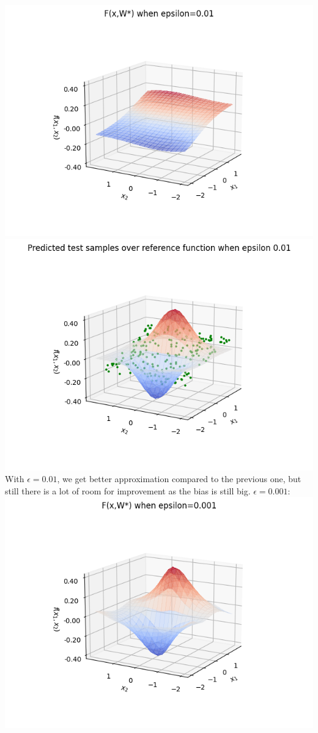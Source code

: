 \documentclass[12pt]{article}
\begin{document}
\includegraphics{model_approx_epsilon_1.png}\\
\includegraphics{model_test_over_ref_func_1.png}\\
With $\epsilon=0.01$, we get better approximation compared to the previous one, but still there is a lot of room for improvement as the bias is still big.
\newpage
$\epsilon=0.001$:\\
\includegraphics{model_approx_epsilon_2.png}\\
\end{document}
